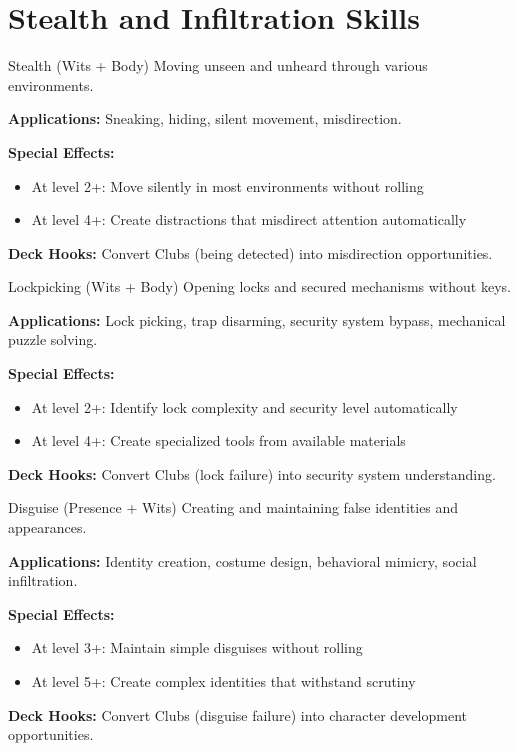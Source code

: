 \section{Stealth and Infiltration Skills}

\begin{skillbox}{Stealth (Wits + Body)}
Moving unseen and unheard through various environments.

\textbf{Applications:} Sneaking, hiding, silent movement, misdirection.

\textbf{Special Effects:}
\begin{itemize}
    \item At level 2+: Move silently in most environments without rolling
    \item At level 4+: Create distractions that misdirect attention automatically
\end{itemize}

\textbf{Deck Hooks:} Convert Clubs (being detected) into misdirection opportunities.
\end{skillbox}

\begin{skillbox}{Lockpicking (Wits + Body)}
Opening locks and secured mechanisms without keys.

\textbf{Applications:} Lock picking, trap disarming, security system bypass, mechanical puzzle solving.

\textbf{Special Effects:}
\begin{itemize}
    \item At level 2+: Identify lock complexity and security level automatically
    \item At level 4+: Create specialized tools from available materials
\end{itemize}

\textbf{Deck Hooks:} Convert Clubs (lock failure) into security system understanding.
\end{skillbox}

\begin{skillbox}{Disguise (Presence + Wits)}
Creating and maintaining false identities and appearances.

\textbf{Applications:} Identity creation, costume design, behavioral mimicry, social infiltration.

\textbf{Special Effects:}
\begin{itemize}
    \item At level 3+: Maintain simple disguises without rolling
    \item At level 5+: Create complex identities that withstand scrutiny
\end{itemize}

\textbf{Deck Hooks:} Convert Clubs (disguise failure) into character development opportunities.
\end{skillbox}

